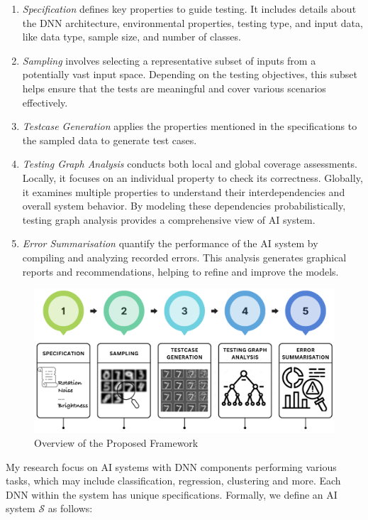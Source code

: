 \begin{enumerate}
  \item \emph{Specification} defines key properties to guide testing. It includes details about the DNN architecture, environmental properties, testing type, and input data, like data type, sample size, and number of classes. 
    \item \emph{Sampling} involves selecting a representative subset of inputs from a potentially vast input space. Depending on the testing objectives, this subset helps ensure that the tests are meaningful and cover various scenarios effectively.
    \item \emph{Testcase Generation} applies the properties mentioned in the specifications to the sampled data to generate test cases.
    \item \emph{Testing Graph Analysis} conducts both local and global coverage assessments. Locally, it focuses on an individual property to check its correctness. Globally, it examines multiple properties to understand their interdependencies and overall system behavior. By modeling these dependencies probabilistically, testing graph analysis provides a comprehensive view of AI system.
    \item \emph{Error Summarisation} quantify the performance of the AI system by compiling and analyzing recorded errors. This analysis generates graphical reports and recommendations, helping to refine and improve the models.
\end{enumerate}

\begin{figure}
  \centering
  \includegraphics[width=\linewidth]{figures/fivesteps.png}
  \caption{Overview of the Proposed Framework}
  \label{fig:framework}
\end{figure}

My research focus on AI systems with DNN components performing various tasks, which may include classification, regression, clustering and more. Each DNN within the system has unique specifications. Formally, we define an AI system $ \mathcal{S} $ as follows:

